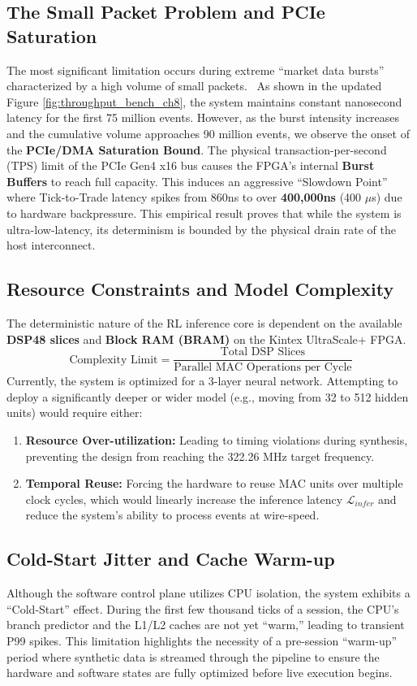 \subsection{The Small Packet Problem and PCIe Saturation}
The most significant limitation occurs during extreme ``market data bursts'' characterized by a high volume of small packets. \datamethodology\ As shown in the updated Figure \ref{fig:throughput_bench_ch8}, the system maintains constant nanosecond latency for the first 75 million events. 
However, as the burst intensity increases and the cumulative volume approaches 90 million events, we observe the onset of the \textbf{PCIe/DMA Saturation Bound}. The physical transaction-per-second (TPS) limit of the PCIe Gen4 x16 bus causes the FPGA's internal \textbf{Burst Buffers} to reach full capacity. This induces an aggressive ``Slowdown Point'' where Tick-to-Trade latency spikes from 860ns to over \textbf{400,000ns} (400 $\mu$s) due to hardware backpressure. This empirical result proves that while the system is ultra-low-latency, its determinism is bounded by the physical drain rate of the host interconnect.

\subsection{Resource Constraints and Model Complexity}
The deterministic nature of the RL inference core is dependent on the available \textbf{DSP48 slices} and \textbf{Block RAM (BRAM)} on the Kintex UltraScale+ FPGA. 
\begin{equation}
    \text{Complexity Limit} = \frac{\text{Total DSP Slices}}{\text{Parallel MAC Operations per Cycle}}
\end{equation}
Currently, the system is optimized for a 3-layer neural network. Attempting to deploy a significantly deeper or wider model (e.g., moving from 32 to 512 hidden units) would require either:
\begin{enumerate}
    \item \textbf{Resource Over-utilization:} Leading to timing violations during synthesis, preventing the design from reaching the 322.26 MHz target frequency.
    \item \textbf{Temporal Reuse:} Forcing the hardware to reuse MAC units over multiple clock cycles, which would linearly increase the inference latency $\mathcal{L}_{infer}$ and reduce the system's ability to process events at wire-speed.
\end{enumerate}

\subsection{Cold-Start Jitter and Cache Warm-up}
Although the software control plane utilizes CPU isolation, the system exhibits a ``Cold-Start'' effect. During the first few thousand ticks of a session, the CPU's branch predictor and the L1/L2 caches are not yet ``warm,'' leading to transient P99 spikes. This limitation highlights the necessity of a pre-session ``warm-up'' period where synthetic data is streamed through the pipeline to ensure the hardware and software states are fully optimized before live execution begins.

